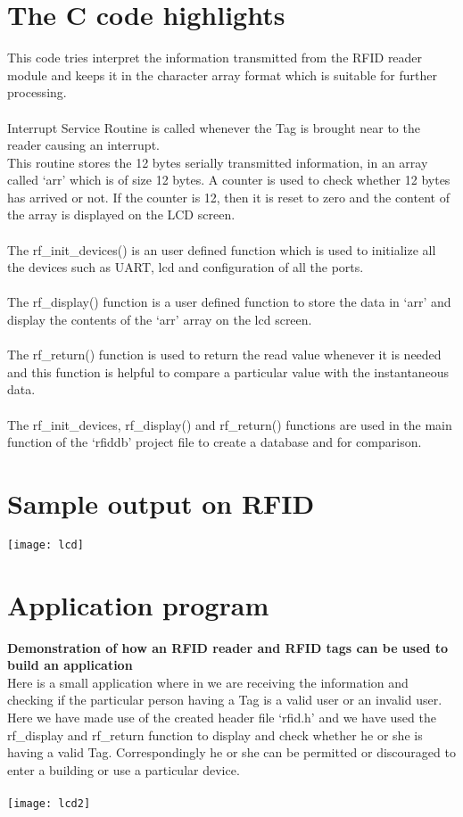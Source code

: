 \documentclass[a4paper,29.6pt]{article}
\begin{document}
\newpage
\section{The C code highlights}
\begin{small}
This code tries interpret the information transmitted from the RFID reader module and keeps it in the character array format which is suitable for further processing.\\\\
Interrupt Service Routine is called whenever the Tag is brought near to the reader causing an interrupt.\\
This routine stores the 12 bytes serially transmitted information, in an array called ‘arr’ which is of size 12 bytes. A counter is used to check whether 12 bytes has arrived or not. If the counter is 12, then it is reset to zero and the content of the array is displayed on the LCD screen.\\\\
The rf\_init\_devices() is  an user defined function which is used to initialize all the devices such as UART, lcd and configuration of all the ports.\\\\
The rf\_display() function is a user defined  function to store the data in ‘arr’ and display the contents of  the ‘arr’ array on the lcd screen.\\\\
The rf\_return() function is used to return the read value whenever it is needed and this function is helpful to compare a particular value with the instantaneous data.\\\\
The rf\_init\_devices,  rf\_display() and rf\_return() functions are used in the main function of the ‘rfiddb’ project file to create a database and for comparison.

\end{small}
\section{Sample output on RFID}
\texttt{[image: lcd]}

\newpage
\section{Application program}
\begin{small}
\textbf{Demonstration of how an RFID reader and RFID tags can be used to build an application}\\
Here is a small application where in we are receiving the information and checking if the particular person having a Tag is a valid user or an invalid user.\\
Here we have made use of the created header file ‘rfid.h’ and we have used the rf\_display and rf\_return function to display and check whether he or she is having a valid Tag. Correspondingly he or she can be permitted or discouraged to enter a building or use a particular device.\\\\
\texttt{[image: lcd2]}
\end{small}
\end{document}
